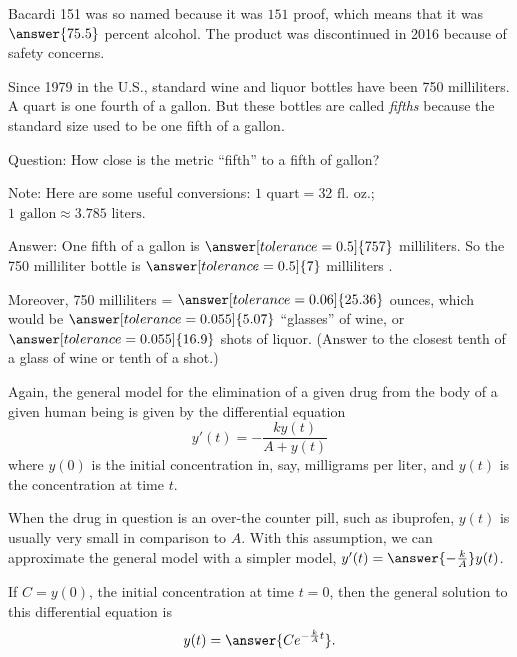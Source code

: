 \documentclass{ximera}
\begin{document}
\begin{question}
Bacardi 151 was so named because it was $151$ proof, which means that it was $\answer{75.5}$ percent alcohol.  The product was discontinued in 2016 because of safety concerns.  

\begin{question}

Since 1979 in the U.S., standard wine and liquor bottles have been 750 milliliters.  A quart is one fourth of a gallon.  But these bottles are called \emph{fifths} because the standard size used to be one fifth of a gallon.  

Question: How close is the metric ``fifth'' to  a fifth of gallon? 

Note: Here are some useful conversions:  $1 \textrm{ quart} = 32 \textrm{ fl.\ oz.}$;  $1 \textrm{ gallon} \approx 3.785 \textrm{ liters}$.  
 
Answer: One fifth of a gallon is $\answer[tolerance=0.5]{757}$ milliliters.  So the 750 milliliter bottle is $\answer[tolerance=0.5]{7}$ milliliters 
.  

Moreover, 750 milliliters = $\answer[tolerance=0.06]{25.36}$ ounces, which would be $\answer[tolerance=0.055]{5.07}$ ``glasses'' of wine, or $\answer[tolerance=0.055]{16.9}$ shots of liquor.  (Answer to the closest tenth of a glass of wine or tenth of a shot.) 

\end{question}
\end{question}

Again, the general model for  the elimination of a given drug from the body of a given human being is given by the differential equation 
$$y'(t)=-\frac{ky(t)}{A+y(t)}$$
where $y(0)$ is the initial concentration in, say, milligrams per liter, and $y(t)$ is the concentration at time $t$. 

\begin{question}
When the drug in question is an over-the counter pill, such as ibuprofen, $y(t)$ is usually very small in comparison to $A$.   With this assumption, we can approximate the general model with a simpler model, $y'(t)=\answer{-\frac{k}{A}}y(t)$.    

If $C=y(0)$, the initial concentration at time $t=0$, then the general solution to this differential equation is 
\[  
y(t) =\answer{Ce^{-\frac{k}{A}t}}. 
\]

\end{question}
\end{document}
